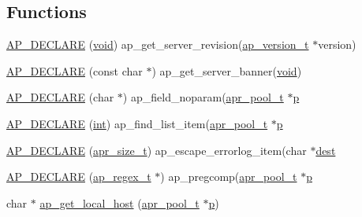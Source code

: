 \subsection*{Functions}
\begin{DoxyCompactItemize}
\item 
\hyperlink{group__APACHE__CORE__DAEMON_ga98d9ecbdc4a30bbaf4c5a47c65874599}{A\+P\+\_\+\+D\+E\+C\+L\+A\+RE} (\hyperlink{group__MOD__ISAPI_gacd6cdbf73df3d9eed42fa493d9b621a6}{void}) ap\+\_\+get\+\_\+server\+\_\+revision(\hyperlink{structap__version__t}{ap\+\_\+version\+\_\+t} $\ast$version)
\item 
\hyperlink{group__APACHE__CORE__DAEMON_ga34542be6f597aa4a9eca1968073cfc9d}{A\+P\+\_\+\+D\+E\+C\+L\+A\+RE} (const char $\ast$) ap\+\_\+get\+\_\+server\+\_\+banner(\hyperlink{group__MOD__ISAPI_gacd6cdbf73df3d9eed42fa493d9b621a6}{void})
\item 
\hyperlink{group__APACHE__CORE__DAEMON_ga83eec54fbab15967dc52423761822d4a}{A\+P\+\_\+\+D\+E\+C\+L\+A\+RE} (char $\ast$) ap\+\_\+field\+\_\+noparam(\hyperlink{structapr__pool__t}{apr\+\_\+pool\+\_\+t} $\ast$\hyperlink{group__APACHE__CORE__MPM_ga5cd91701e5c167f2b1a38e70ab57817e}{p}
\item 
\hyperlink{group__APACHE__CORE__DAEMON_gaa090fd6e4c79879a11154fd2c3a601e6}{A\+P\+\_\+\+D\+E\+C\+L\+A\+RE} (\hyperlink{pcre_8txt_a42dfa4ff673c82d8efe7144098fbc198}{int}) ap\+\_\+find\+\_\+list\+\_\+item(\hyperlink{structapr__pool__t}{apr\+\_\+pool\+\_\+t} $\ast$\hyperlink{group__APACHE__CORE__MPM_ga5cd91701e5c167f2b1a38e70ab57817e}{p}
\item 
\hyperlink{group__APACHE__CORE__DAEMON_ga6244ff1624044deef6f392f4cb55b103}{A\+P\+\_\+\+D\+E\+C\+L\+A\+RE} (\hyperlink{group__apr__platform_gaaa72b2253f6f3032cefea5712a27540e}{apr\+\_\+size\+\_\+t}) ap\+\_\+escape\+\_\+errorlog\+\_\+item(char $\ast$\hyperlink{group__apr__thread__proc_gaaf051c44ea7115367430b40d8fdd496e}{dest}
\item 
\hyperlink{group__APACHE__CORE__DAEMON_gaef9a463eb46c9b223497cf9711b5504a}{A\+P\+\_\+\+D\+E\+C\+L\+A\+RE} (\hyperlink{structap__regex__t}{ap\+\_\+regex\+\_\+t} $\ast$) ap\+\_\+pregcomp(\hyperlink{structapr__pool__t}{apr\+\_\+pool\+\_\+t} $\ast$\hyperlink{group__APACHE__CORE__MPM_ga5cd91701e5c167f2b1a38e70ab57817e}{p}
\item 
char $\ast$ \hyperlink{group__APACHE__CORE__DAEMON_ga2dd9b90f73ee5472ab8217dc8cafb00a}{ap\+\_\+get\+\_\+local\+\_\+host} (\hyperlink{structapr__pool__t}{apr\+\_\+pool\+\_\+t} $\ast$\hyperlink{group__APACHE__CORE__MPM_ga5cd91701e5c167f2b1a38e70ab57817e}{p})

\end{DoxyCompactItemize}
